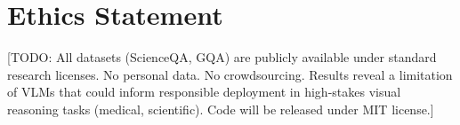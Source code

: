\documentclass{colm2026}
\begin{document}
\section{Ethics Statement}
\label{sec:ethics}

[TODO: All datasets (ScienceQA, GQA) are publicly available under standard
research licenses. No personal data. No crowdsourcing. Results reveal a
limitation of VLMs that could inform responsible deployment in high-stakes
visual reasoning tasks (medical, scientific). Code will be released under MIT license.]



\end{document}
